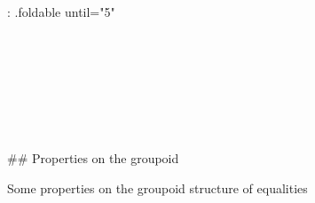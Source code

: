 {{{{{{{: .foldable until="5" }
\begin{code}%
\>[0]\<%
\\
\>[0][@{}l@{\AgdaIndent{0}}]%
\>[2]\AgdaSymbol{:}\AgdaSpace{}%
\AgdaSpace{}%
\AgdaSymbol{\{}\AgdaSpace{}%
\AgdaSymbol{:}\AgdaSpace{}%
\AgdaSpace{}%
\AgdaSymbol{\}}\AgdaSpace{}%
\AgdaSymbol{\{}\AgdaSpace{}%
\AgdaSymbol{:}\AgdaSpace{}%
\AgdaSpace{}%
\AgdaSymbol{\}}\AgdaSpace{}%
\AgdaSymbol{\{}\AgdaSpace{}%
\AgdaSpace{}%
\AgdaSymbol{:}\AgdaSpace{}%
\AgdaSymbol{\}}\AgdaSpace{}%
\AgdaSymbol{\{}\AgdaSpace{}%
\AgdaSymbol{:}\AgdaSpace{}%
\AgdaSymbol{\}}\<%
\\
%
\>[2]\AgdaSpace{}%
\AgdaSymbol{(}\AgdaSpace{}%
\AgdaSymbol{:}\AgdaSpace{}%
\AgdaSpace{}%
\AgdaOperator{\AgdaDatatype{==}}\AgdaSpace{}%
\AgdaSymbol{)}\<%
\\
%
\>[2]\AgdaComment{-----------------------}\<%
\\
%
\>[2]\AgdaSpace{}%
\AgdaSpace{}%
\AgdaSpace{}%
\AgdaBound{\AgdaUnderscore{}}\AgdaSpace{}%
\AgdaSpace{}%
\AgdaSymbol{)}\AgdaSpace{}%
\AgdaSpace{}%
\AgdaOperator{\AgdaDatatype{==}}\AgdaSpace{}%
\<%
\\
%
\\[\AgdaEmptyExtraSkip]%
\>[0]\AgdaSpace{}%
\AgdaSymbol{\{}\AgdaSpace{}%
\AgdaSymbol{=}\AgdaSpace{}%
\AgdaSymbol{\}}\AgdaSpace{}%
\AgdaSpace{}%
\AgdaSymbol{=}\AgdaSpace{}%
\AgdaSpace{}%
\AgdaSymbol{(}\AgdaSpace{}%
\AgdaSymbol{)}\<%
\end{code}

## Properties on the groupoid

Some properties on the groupoid structure of equalities

}}}}}}
